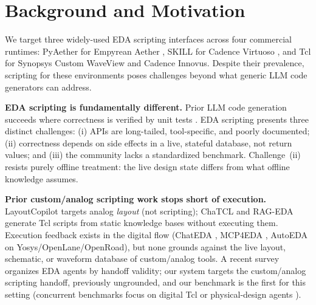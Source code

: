 \section{Background and Motivation}
\label{sec:background}

We target three widely-used EDA scripting interfaces across four commercial runtimes: PyAether for Empyrean Aether \cite{empyrean_pyaether}, SKILL for Cadence Virtuoso \cite{cadence2024virtuoso}, and Tcl for Synopsys Custom WaveView and Cadence Innovus. Despite their prevalence, scripting for these environments poses challenges beyond what generic LLM code generators can address.

\textbf{EDA scripting is fundamentally different.} Prior LLM code generation succeeds where correctness is verified by unit tests \cite{chen2021evaluating, austin2021program}. EDA scripting presents three distinct challenges: (i) APIs are long-tailed, tool-specific, and poorly documented; (ii) correctness depends on side effects in a live, stateful database, not return values; and (iii) the community lacks a standardized benchmark. Challenge~(ii) resists purely offline treatment: the live design state differs from what offline knowledge assumes.

\textbf{Prior custom/analog scripting work stops short of execution.} LayoutCopilot \cite{liu2025layoutcopilot} targets analog \emph{layout} (not scripting); ChaTCL \cite{rui2025chatcl} and RAG-EDA \cite{pu2024rag} generate Tcl scripts from static knowledge bases without executing them. Execution feedback exists in the digital flow (ChatEDA \cite{he2024chateda}, MCP4EDA \cite{wang2025mcp4eda}, AutoEDA \cite{lee2025autoeda} on Yosys/OpenLane/OpenRoad), but none grounds against the live layout, schematic, or waveform database of custom/analog tools. A recent survey \cite{liu2026agentic} organizes EDA agents by handoff validity; our system targets the custom/analog scripting handoff, previously ungrounded, and our benchmark is the first for this setting (concurrent benchmarks focus on digital Tcl \cite{xu2026iscript} or physical-design agents \cite{li2026pdagent}).

